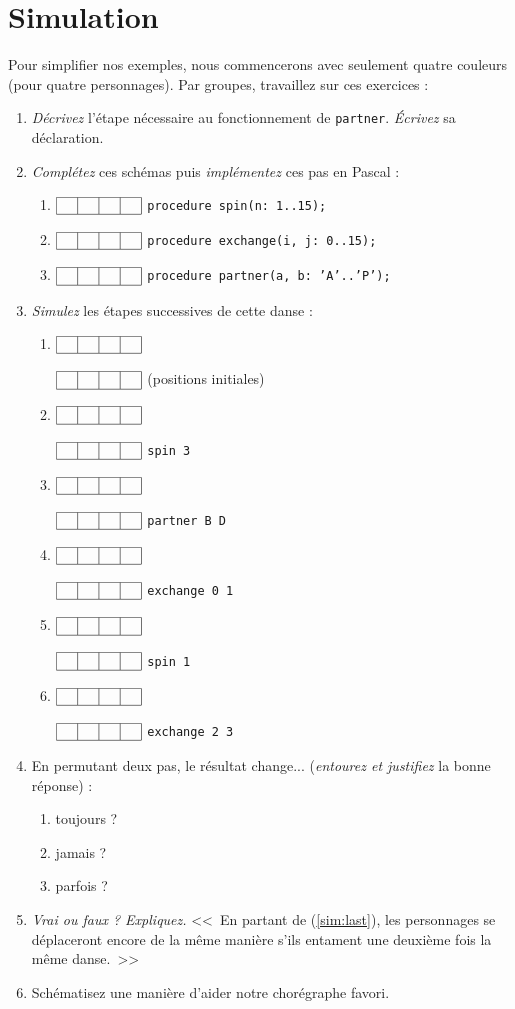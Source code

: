 \documentclass[11pt,a4paper,oneside]{book}
\begin{document}
\chapter{Simulation}\label{ch:sim}
Pour simplifier nos exemples, nous commencerons avec seulement quatre couleurs
(pour quatre personnages).
\newcommand{\boxes}{
	$\begin{array}{|l|l|l|l|}\hline
	\phantom{a} & \phantom{a} & \phantom{a} & \phantom{a} \\ \hline
	\end{array}$
}
Par groupes, travaillez sur ces exercices :
\begin{enumerate}
\item \emph{Décrivez} l'étape nécessaire au fonctionnement de \texttt{partner}.
	\emph{Écrivez} sa déclaration.
\item \emph{Complétez} ces schémas puis \emph{implémentez} ces pas en Pascal :
	\begin{enumerate}
	\item \boxes \texttt{procedure spin(n: 1..15);}
	\item \boxes \texttt{procedure exchange(i, j: 0..15);}
	\item \boxes \texttt{procedure partner(a, b: 'A'..'P');}
	\end{enumerate}
\item \emph{Simulez} les étapes successives de cette danse :
	\begin{enumerate}
	\item \boxes \boxes (positions initiales)
	\item \boxes \boxes \texttt{spin 3}
	\item \boxes \boxes \texttt{partner B D}
	\item \boxes \boxes \texttt{exchange 0 1}
	\item \boxes \boxes \texttt{spin 1}
	\item \boxes \boxes \texttt{exchange 2 3} \label{sim:last}
	\end{enumerate}
\item En permutant deux pas, le résultat change...
	(\emph{entourez et justifiez} la bonne réponse) :
	\begin{enumerate}
		\item toujours ? 
		\item jamais ? 
		\item parfois ?
	\end{enumerate}
\item \emph{Vrai ou faux ? Expliquez. }
	<<~En partant de (\ref{sim:last}), les personnages se déplaceront encore de
	la même manière s'ils entament une deuxième fois la même danse.~>>
\item Schématisez une manière d'aider notre chorégraphe favori.
\end{enumerate}
\end{document}
